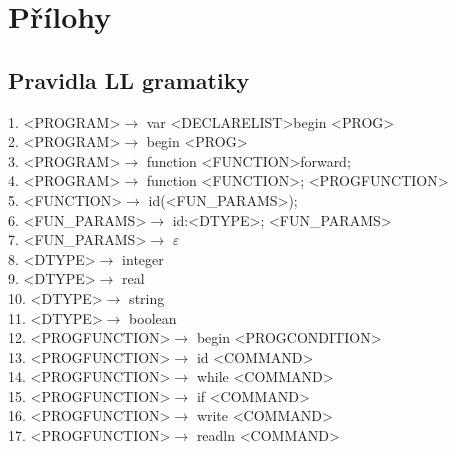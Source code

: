 \documentclass[12pt,a4paper,titlepage,final]{report}
\begin{document}
\chapter{Přílohy} \label{prilohy}
\section{Pravidla LL gramatiky}
1. \textless PROGRAM\textgreater  $\rightarrow$ var \textless DECLARELIST\textgreater  begin \textless PROG\textgreater \\
2. \textless PROGRAM\textgreater  $\rightarrow$ begin \textless PROG\textgreater \\
3. \textless PROGRAM\textgreater  $\rightarrow$ function \textless FUNCTION\textgreater  forward; \\
4. \textless PROGRAM\textgreater  $\rightarrow$ function \textless FUNCTION\textgreater ; \textless PROGFUNCTION\textgreater \\
5. \textless FUNCTION\textgreater  $\rightarrow$ id(\textless FUN\_PARAMS\textgreater ); \\
6. \textless FUN\_PARAMS\textgreater  $\rightarrow$ id:\textless DTYPE\textgreater ; \textless FUN\_PARAMS\textgreater \\
7. \textless FUN\_PARAMS\textgreater  $\rightarrow$ $\varepsilon$ \\
8. \textless DTYPE\textgreater  $\rightarrow$ integer \\
9. \textless DTYPE\textgreater  $\rightarrow$ real \\
10. \textless DTYPE\textgreater  $\rightarrow$ string \\
11. \textless DTYPE\textgreater  $\rightarrow$ boolean \\
12. \textless PROGFUNCTION\textgreater  $\rightarrow$ begin \textless PROGCONDITION\textgreater \\
13. \textless PROGFUNCTION\textgreater  $\rightarrow$ id \textless COMMAND\textgreater \\
14. \textless PROGFUNCTION\textgreater  $\rightarrow$ while \textless COMMAND\textgreater \\
15. \textless PROGFUNCTION\textgreater  $\rightarrow$ if \textless COMMAND\textgreater \\
16. \textless PROGFUNCTION\textgreater  $\rightarrow$ write \textless COMMAND\textgreater \\
17. \textless PROGFUNCTION\textgreater  $\rightarrow$ readln \textless COMMAND\textgreater \\
\end{document}
